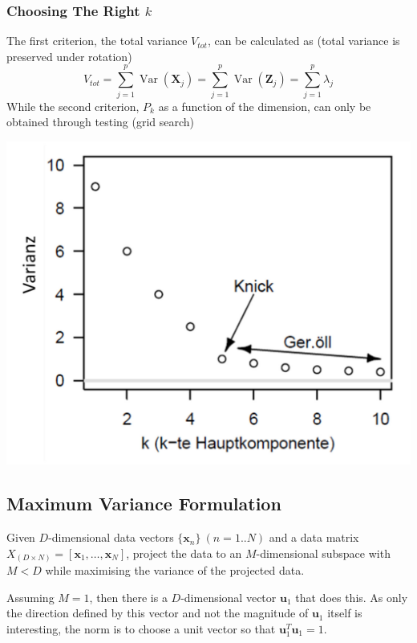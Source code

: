 \documentclass[11pt]{article}
\theoremstyle{definition}
\newcommand*\Var[1]{\mathop{\text{Var}}\left(#1\right)}
\begin{document}
\subsubsection{Choosing The Right $k$}
The first criterion, the total variance $V_{tot}$, can be calculated as (total variance is preserved under rotation)
\begin{equation*}
	V_{tot} = \sum_{j=1}^{p}\Var{\textbf{X}_j} = \sum_{j=1}^{p} \Var{\textbf{Z}_j} = \sum_{j=1}^{p} \lambda_j
\end{equation*}
While the second criterion, $P_k$ as a function of the dimension, can only be obtained through testing (grid search)
\begin{center}
	\includegraphics[width=0.4\linewidth]{img/pca_k}
\end{center}

\subsection{Maximum Variance Formulation}
Given $D$-dimensional data vectors $\{\textbf{x}_n\}\ (n=1..N)$ and a data matrix $X_{(D\times N)} = \left[\textbf{x}_1,\dots, \textbf{x}_N\right]$, project the data to an $M$-dimensional subspace with $M<D$ while maximising the variance of the projected data.

Assuming $M=1$, then there is a $D$-dimensional vector $\textbf{u}_1$ that does this. As only the direction defined by this vector and not the magnitude of $\textbf{u}_1$ itself is interesting, the norm is to choose a unit vector so that $\textbf{u}_1^T\textbf{u}_1 = 1$.
\end{document}

